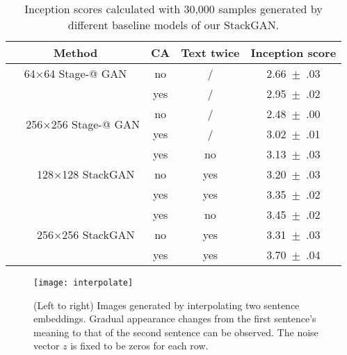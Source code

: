 \documentclass[10pt,twocolumn,letterpaper]{article}
\makeatletter
\newcommand{\Rmnum}[1]{\expandafter\@slowromancap\romannumeral #1@}
\makeatother
\begin{document}
\begin{table}
\begin{center}
\scriptsize
\begin{tabular}{|c|c|c|c|}
\hline
Method &CA &Text twice  &Inception score \\
\hline
64$\times$64 Stage-\Rmnum{1} GAN  &no    &/     &2.66~$\pm$~.03   \\
                                  &yes   &/     &2.95~$\pm$~.02   \\
\hline
\multirow{2}{3cm}{\,\,\,\,\,\,\,\,256$\times$256 Stage-\Rmnum{1} GAN}
                                  &no    &/     &2.48~$\pm$~.00   \\
                                  &yes    &/     &3.02~$\pm$~.01   \\
\hline
\multirow{3}{3cm}{\,\,\,\,\,\,\,\,\,\,\,128$\times$128 StackGAN}
                                  &yes   &no    &3.13~$\pm$~.03  \\ 
                                  &no    &yes   &3.20~$\pm$~.03  \\
                                  &yes   &yes   &3.35~$\pm$~.02  \\
\hline
\multirow{3}{3cm}{\,\,\,\,\,\,\,\,\,\,\,256$\times$256 StackGAN}
                                  &yes   &no    &3.45~$\pm$~.02  \\ 
                                  &no    &yes   &3.31~$\pm$~.03  \\
                                  &yes   &yes   &3.70~$\pm$~.04  \\
\hline
\end{tabular}
\end{center}
\vspace{-5pt}
    \caption{Inception scores calculated with 30,000 samples generated by different baseline models of our StackGAN.}
\label{tab:inception_score}
\vspace{-10pt}
\end{table}



\begin{figure}[bt]
\begin{center}
	\texttt{[image: interpolate]}
\end{center}
\vspace{-8pt}
   \caption{(Left to right) Images generated by interpolating two sentence embeddings. Gradual appearance changes from the first sentence's meaning to that of the second sentence can be observed. The noise vector $z$ is fixed to be zeros for each row.}
\vspace{-10pt}
\label{fig:interpolate}
\end{figure}
\end{document}

